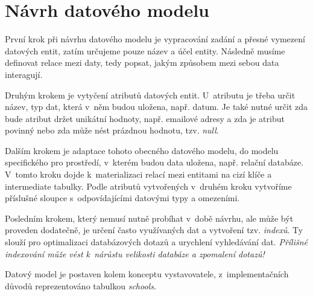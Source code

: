 \section{Návrh datového modelu}
\label{sub:data-model}

První krok\cite{data-model} při návrhu datového modelu je vypracování zadání a přesné vymezení datových entit, zatím určujeme pouze název a účel entity. Následně musíme definovat relace mezi daty, tedy popsat, jakým způsobem mezi sebou data interagují.

Druhým krokem je vytyčení atributů datových entit. U~atributu je třeba určit název, typ dat, která v~něm budou uložena, např. datum. Je také nutné určit zda bude atribut držet unikátní hodnoty, např. emailové adresy a zda je atribut povinný nebo zda může nést prázdnou hodnotu, tzv. \emph{null}\cite{null}.

Dalším krokem je adaptace tohoto obecného datového modelu, do modelu specifického pro prostředí, v~kterém budou data uložena, např. relační databáze. V~tomto kroku dojde k~materializaci relací mezi entitami na cizí klíče a intermediate tabulky\cite{intermediate-table}. Podle atributů vytvořených v~druhém kroku vytvoříme příslušné sloupce s~odpovídajícími datovými typy a omezeními. 

Posledním krokem, který nemusí nutně probíhat v~době návrhu, ale může být proveden dodatečně, je určení často využívaných dat a vytvoření tzv. \emph{indexů}\cite{index}. Ty slouží pro optimalizaci databázových dotazů a urychlení vyhledávání dat. \emph{Přílišné indexování může vést k~nárůstu velikosti databáze a zpomalení dotazů!}\cite{bad-indexing}

Datový model \bso{} je postaven kolem konceptu vystavovatele, z~implementačních důvodů reprezentováno tabulkou \emph{schools}.

